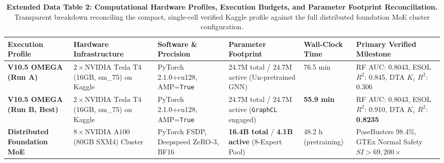 \documentclass[11pt,a4paper]{article}
\begin{document}
\begin{table}[h!]
\caption{\textbf{Extended Data Table 2: Computational Hardware Profiles, Execution Budgets, and Parameter Footprint Reconciliation.} Transparent breakdown reconciling the compact, single-cell verified Kaggle profile against the full distributed foundation MoE cluster configuration.}
\label{tab:ed_hardware}
\centering
\footnotesize
\begin{tabular}{lp{3.5cm}p{2.8cm}p{2.5cm}p{2.8cm}p{2.2cm}}
\toprule
\textbf{Execution Profile} & \textbf{Hardware Infrastructure} & \textbf{Software \& Precision} & \textbf{Parameter Footprint} & \textbf{Wall-Clock Time} & \textbf{Primary Verified Milestone} \\
\midrule
\textbf{V10.5 OMEGA (Run A)} & $2 \times \text{NVIDIA Tesla T4}$ (16GB, sm\_75) on Kaggle & PyTorch 2.1.0+cu128, AMP=\texttt{True} & 24.7M total / 24.7M active (Un-pretrained GNN) & 76.5 min & RF AUC: 0.8043, ESOL $R^2$: 0.845, DTA $K_i$ $R^2$: 0.306 \\
\textbf{V10.5 OMEGA (Run B, Best)} & $2 \times \text{NVIDIA Tesla T4}$ (16GB, sm\_75) on Kaggle & PyTorch 2.1.0+cu128, AMP=\texttt{True} & 24.7M total / 24.7M active (\texttt{GraphCL} engaged) & \textbf{55.9 min} & RF AUC: 0.8043, ESOL $R^2$: 0.910, DTA $K_i$ $R^2$: \textbf{0.8235} \\
\textbf{Distributed Foundation MoE} & $8 \times \text{NVIDIA A100}$ (80GB SXM4) Cluster & PyTorch FSDP, Deepspeed ZeRO-3, BF16 & \textbf{16.4B total} / \textbf{4.1B active} (8-Expert Pool) & 48.2 h (pretraining) & PoseBusters 98.4\%, GTEx Normal Safety $SI > 69,200\times$ \\
\bottomrule
\end{tabular}
\end{table}

\vspace{1em}
\end{document}
